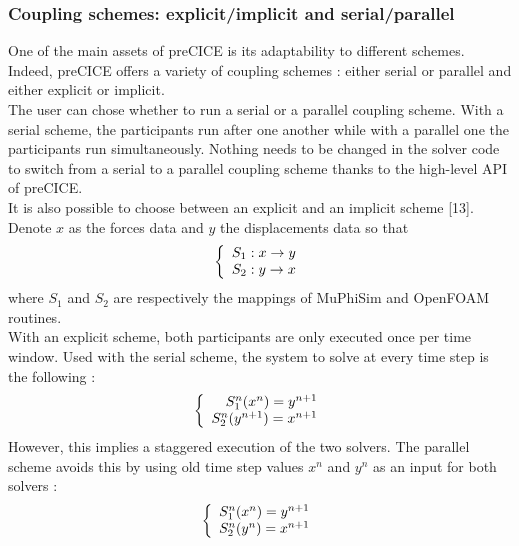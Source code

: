 \documentclass[oneside,11pt,times]{book}
\begin{document}
\subsubsection{Coupling schemes: explicit/implicit and serial/parallel}
One of the main assets of preCICE is its adaptability to different schemes. Indeed, preCICE offers a variety of coupling schemes : either serial or parallel and either explicit or implicit.\\

The user can chose whether to run a serial or a parallel coupling scheme. With a serial scheme, the participants run after one another while with a parallel one the participants run simultaneously. Nothing needs to be changed in the solver code to switch from a serial to a parallel coupling scheme thanks to the high-level API of preCICE.\\

It is also possible to choose between an explicit and an implicit scheme [13].
Denote $x$ as the forces data and $y$ the displacements data so that
\begin{equation}
    \left\{
        \begin{array}{r c l}
        S_1 : x \rightarrow y\\
        S_2 : y \rightarrow x
        \end{array}
        \right.
\end{equation}
where $S_1$ and $S_2$ are respectively the mappings of MuPhiSim and OpenFOAM routines.\\

With an explicit scheme, both participants are only executed once per time window. Used with the serial scheme, the system to solve at every time step is the following :
\begin{equation}
    \left\{
        \begin{array}{r c l}
        S_1^n(x^n) = y^{n+1}\\
        S_2^n(y^{n+1}) = x^{n+1}
        \end{array}
        \right.
\end{equation}
However, this implies a staggered execution of the two solvers. The parallel scheme avoids this by using old time step values $x^n$ and $y^n$ as an input for both solvers :
\begin{equation}
    \left\{
        \begin{array}{r c l}
        S_1^n(x^n) = y^{n+1}\\
        S_2^n(y^n) = x^{n+1}
        \end{array}
        \right.
\end{equation}
\end{document}
